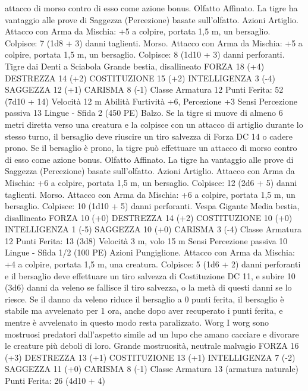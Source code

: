 \begin{multicols}{2}
attacco di morso contro di esso come azione bonus.
Olfatto Affinato. La tigre ha vantaggio alle prove di Saggezza
(Percezione) basate sull’olfatto.
Azioni
Artiglio. Attacco con Arma da Mischia: +5 a colpire, portata 1,5
m, un bersaglio.
Colpisce: 7 (1d8 + 3) danni taglienti.
Morso. Attacco con Arma da Mischia: +5 a colpire, portata 1,5
m, un bersaglio.
Colpisce: 8 (1d10 + 3) danni perforanti.
Tigre dai Denti a
Sciabola
Grande bestia, disallineato
FORZA 18 (+4)
DESTREZZA 14 (+2)
COSTITUZIONE 15 (+2)
INTELLIGENZA 3 (-4)
SAGGEZZA 12 (+1)
CARISMA 8 (-1)
Classe Armatura 12
\hspace*{0pt}\hfill{Punti Ferita}: 52 (7d10 + 14)
Velocità 12 m
Abilità Furtività +6, Percezione +3
Sensi Percezione passiva 13
Lingue -
Sfida 2 (450 PE)
Balzo. Se la tigre si muove di almeno 6 metri diretta verso una
creatura e la colpisce con un attacco di artiglio durante lo stesso
turno, il bersaglio deve riuscire un tiro salvezza di Forza DC 14 o
cadere prono. Se il bersaglio è prono, la tigre può effettuare un
attacco di morso contro di esso come azione bonus.
Olfatto Affinato. La tigre ha vantaggio alle prove di Saggezza
(Percezione) basate sull’olfatto.
Azioni
Artiglio. Attacco con Arma da Mischia: +6 a colpire, portata 1,5
m, un bersaglio.
Colpisce: 12 (2d6 + 5) danni taglienti.
Morso. Attacco con Arma da Mischia: +6 a colpire, portata 1,5
m, un bersaglio.
Colpisce: 10 (1d10 + 5) danni perforanti.
Vespa Gigante
Media bestia, disallineato
FORZA 10 (+0)
DESTREZZA 14 (+2)
COSTITUZIONE 10 (+0)
INTELLIGENZA 1 (-5)
SAGGEZZA 10 (+0)
CARISMA 3 (-4)
Classe Armatura 12
\hspace*{0pt}\hfill{Punti Ferita}: 13 (3d8)
Velocità 3 m, volo 15 m
Sensi Percezione passiva 10
Lingue -
Sfida 1/2 (100 PE)
Azioni
Pungiglione. Attacco con Arma da Mischia: +4 a colpire, portata
1,5 m, una creatura.
Colpisce: 5 (1d6 + 2) danni perforanti e il bersaglio deve
effettuare un tiro salvezza di Costituzione DC 11, e subire 10
(3d6) danni da veleno se fallisce il tiro salvezza, o la metà di
questi danni se lo riesce. Se il danno da veleno riduce il bersaglio
a 0 punti ferita, il bersaglio è stabile ma avvelenato per 1 ora,
anche dopo aver recuperato i punti ferita, e mentre è avvelenato
in questo modo resta paralizzato.
Worg
I worg sono mostruosi predatori dall’aspetto simile ad
un lupo che amano cacciare e divorare le creature più
deboli di loro.
Grande mostruosità, neutrale malvagio
FORZA 16 (+3)
DESTREZZA 13 (+1)
COSTITUZIONE 13 (+1)
INTELLIGENZA 7 (-2)
SAGGEZZA 11 (+0)
CARISMA 8 (-1)
Classe Armatura 13 (armatura naturale)
\hspace*{0pt}\hfill{Punti Ferita}: 26 (4d10 + 4)

\end{multicols}
